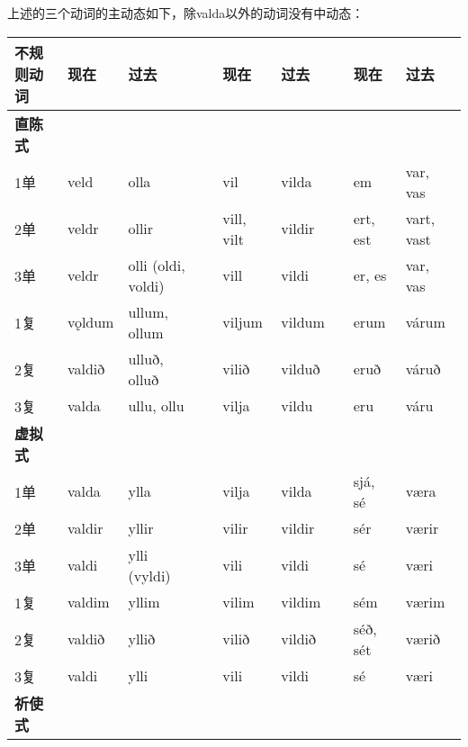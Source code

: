 上述的三个动词的主动态如下，除valda以外的动词没有中动态：

\begin{longtable}{lllllllll}
    \toprule
    不规则动词        & 现在       & 过去                 &  & 现在         & 过去     &  & 现在       & 过去         \\
    \midrule
    \endhead
    \bottomrule
    \endfoot
    \textbf{直陈式} &          &                    &  &            &        &  &          &            \\
    1单           & veld     & olla               &  & vil        & vilda  &  & em       & var, vas   \\
    2单           & veldr    & ollir              &  & vill, vilt & vildir &  & ert, est & vart, vast \\
    3单           & veldr    & olli (oldi, voldi) &  & vill       & vildi  &  & er, es   & var,
    vas                                                                                              \\
    1复           & vǫldum   & ullum, ollum       &  & viljum     & vildum &  & erum     & várum      \\
    2复           & valdið   & ulluð, olluð       &  & vilið      & vilduð &  & eruð     & váruð      \\
    3复           & valda    & ullu, ollu         &  & vilja      & vildu  &  & eru      & váru       \\
    \textbf{虚拟式} &          &                    &  &            &        &  &          &            \\
    1单           & valda    & ylla               &  & vilja      & vilda  &  & sjá, sé  & væra       \\
    2单           & valdir   & yllir              &  & vilir      & vildir &  & sér      & værir      \\
    3单           & valdi    & ylli (vyldi)       &  & vili       & vildi  &  & sé       & væri       \\
    1复           & valdim   & yllim              &  & vilim      & vildim &  & sém      & værim      \\
    2复           & valdið   & yllið              &  & vilið      & vildið &  & séð, sét & værið      \\
    3复           & valdi    & ylli               &  & vili       & vildi  &  & sé       & væri       \\
    \textbf{祈使式} &          &                    &  &            &        &  &          &            \\

\end{longtable}
